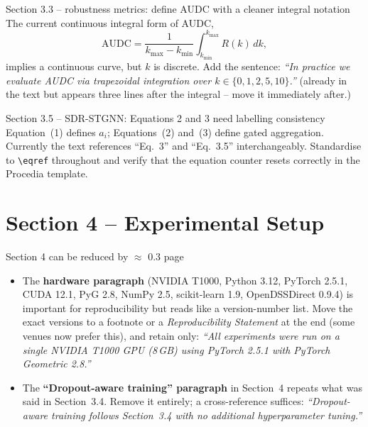 \documentclass[11pt,a4paper]{article}
\begin{document}
\begin{suggestbox}{Section 3.3 -- robustness metrics: define AUDC with a cleaner integral notation}
The current continuous integral form of AUDC,
\[
  \mathrm{AUDC} = \frac{1}{k_{\max}-k_{\min}}\int_{k_{\min}}^{k_{\max}} R(k)\,dk,
\]
implies a continuous curve, but $k$ is discrete. Add the sentence: \textit{``In
practice we evaluate AUDC via trapezoidal integration over
$k \in \{0,1,2,5,10\}$.''} (already in the text but appears three lines after
the integral -- move it immediately after.)
\end{suggestbox}

\begin{warnbox}{Section 3.5 -- SDR-STGNN: Equations 2 and 3 need labelling consistency}
Equation~(1) defines $a_i$; Equations~(2) and~(3) define gated aggregation.
Currently the text references ``Eq.~3'' and ``Eq.~3.5'' interchangeably.
Standardise to \texttt{\textbackslash eqref} throughout and verify that the
equation counter resets correctly in the Procedia template.
\end{warnbox}

\section{Section 4 -- Experimental Setup}

\begin{trimbox}{Section 4 can be reduced by $\approx$ 0.3 page}
\begin{itemize}[leftmargin=*]
  \item The \textbf{hardware paragraph} (NVIDIA T1000, Python 3.12, PyTorch
    2.5.1, CUDA 12.1, PyG 2.8, NumPy 2.5, scikit-learn 1.9,
    OpenDSSDirect 0.9.4) is important for reproducibility but reads like a
    version-number list. Move the exact versions to a footnote or a
    \textit{Reproducibility Statement} at the end (some venues now prefer
    this), and retain only: \textit{``All experiments were run on a single
    NVIDIA T1000 GPU (8\,GB) using PyTorch 2.5.1 with PyTorch Geometric 2.8.''}
  \item The \textbf{``Dropout-aware training'' paragraph} in Section~4
    repeats what was said in Section~3.4. Remove it entirely; a
    cross-reference suffices: \textit{``Dropout-aware training follows
    Section~3.4 with no additional hyperparameter tuning.''}
\end{itemize}
\end{trimbox}
\end{document}
